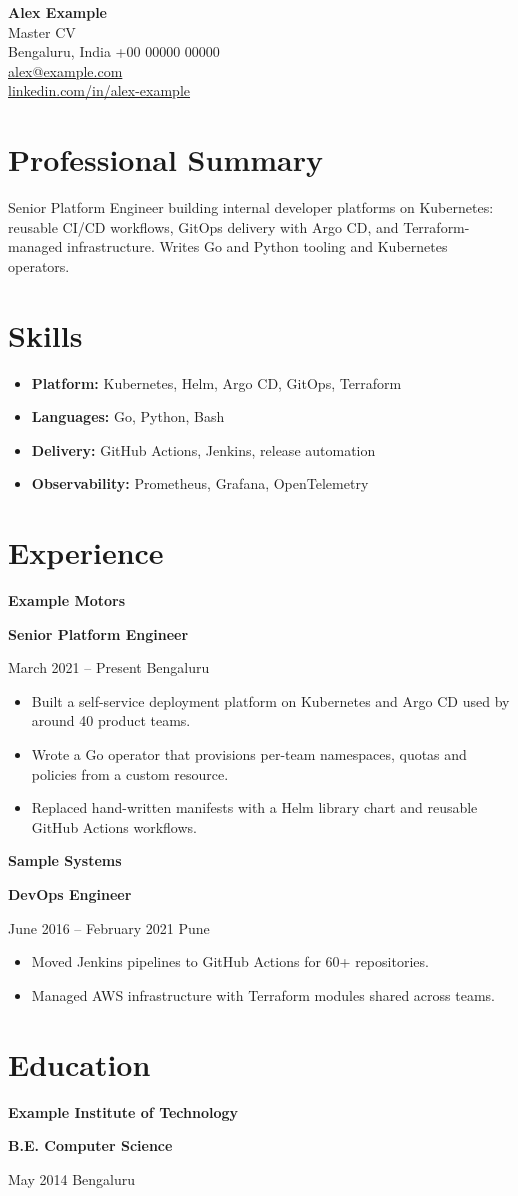 \documentclass[a4paper,11pt]{article}
\newcommand{\role}[4]{%
  \Needspace{6\baselineskip}%
  {\large\textbf{#1}}\par
  \textbf{#2}\par
  #3 \quad\textbar\quad #4\par
}
\newcommand{\skill}[2]{\item \textbf{#1:} #2}
\begin{document}
\begin{center}
  {\Huge\bfseries Alex Example}\\[5pt]
  {\large Master CV}\\[6pt]
  Bengaluru, India \quad\textbar\quad +00 00000 00000\\[3pt]
  \href{mailto:alex@example.com}{alex@example.com}\\[3pt]
  \href{https://www.linkedin.com/in/alex-example}{linkedin.com/in/alex-example}
\end{center}

\section{Professional Summary}
Senior Platform Engineer building internal developer platforms on Kubernetes:
reusable CI/CD workflows, GitOps delivery with Argo CD, and Terraform-managed
infrastructure. Writes Go and Python tooling and Kubernetes operators.

\section{Skills}
\begin{itemize}
  \skill{Platform}{Kubernetes, Helm, Argo CD, GitOps, Terraform}
  \skill{Languages}{Go, Python, Bash}
  \skill{Delivery}{GitHub Actions, Jenkins, release automation}
  \skill{Observability}{Prometheus, Grafana, OpenTelemetry}
\end{itemize}

\section{Experience}

\role{Example Motors}{Senior Platform Engineer}{March 2021 -- Present}{Bengaluru}
\begin{itemize}
  \item Built a self-service deployment platform on Kubernetes and Argo CD used by
    around 40 product teams.
  \item Wrote a Go operator that provisions per-team namespaces, quotas and
    policies from a custom resource.
  \item Replaced hand-written manifests with a Helm library chart and reusable
    GitHub Actions workflows.
\end{itemize}

\role{Sample Systems}{DevOps Engineer}{June 2016 -- February 2021}{Pune}
\begin{itemize}
  \item Moved Jenkins pipelines to GitHub Actions for 60+ repositories.
  \item Managed AWS infrastructure with Terraform modules shared across teams.
\end{itemize}

\section{Education}
\role{Example Institute of Technology}{B.E. Computer Science}{May 2014}{Bengaluru}
\end{document}
